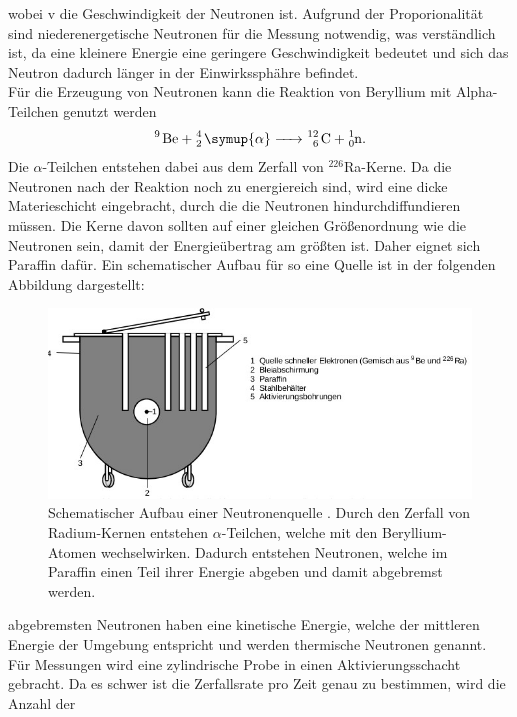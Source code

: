 wobei v die Geschwindigkeit der Neutronen ist.
Aufgrund der Proporionalität sind niederenergetische Neutronen für die Messung notwendig,
was verständlich ist, da eine kleinere Energie eine geringere Geschwindigkeit bedeutet
und sich das Neutron dadurch länger in der Einwirkssphähre befindet.\\
Für die Erzeugung von Neutronen kann die Reaktion von Beryllium mit 
Alpha-Teilchen genutzt werden \cite{V702}
\begin{align}
    \ce{ ^9 Be + _2^4 \symup{\alpha} -> _6^{12} C + _0^1n }. \label{eq:4}
\end{align}
Die $\alpha$-Teilchen entstehen dabei aus dem Zerfall von $^{226} $Ra-Kerne.
Da die Neutronen nach der Reaktion noch zu energiereich sind, wird eine dicke Materieschicht eingebracht,
durch die die Neutronen hindurchdiffundieren müssen. Die Kerne davon sollten auf
einer gleichen Größenordnung wie die Neutronen sein, damit der Energieübertrag am größten ist.
Daher eignet sich Paraffin dafür. Ein schematischer Aufbau für so eine Quelle ist in der folgenden Abbildung
dargestellt:
\begin{figure}[H]
    \centering
    \includegraphics[width=\linewidth]{images/neutron_quelle.jpg}
    \caption{Schematischer Aufbau einer Neutronenquelle \cite{V702}.
    Durch den Zerfall von Radium-Kernen entstehen $\alpha$-Teilchen,
    welche mit den Beryllium-Atomen wechselwirken. Dadurch entstehen Neutronen,
    welche im Paraffin einen Teil ihrer Energie abgeben und damit abgebremst werden.
    }
    \label{fig:1}
\end{figure}
\justifying abgebremsten Neutronen haben eine kinetische Energie, welche der mittleren Energie der Umgebung entspricht und
werden thermische Neutronen genannt.\\
Für Messungen wird eine zylindrische Probe in einen Aktivierungsschacht gebracht.
Da es schwer ist die Zerfallsrate pro Zeit genau zu bestimmen, wird die Anzahl der 
